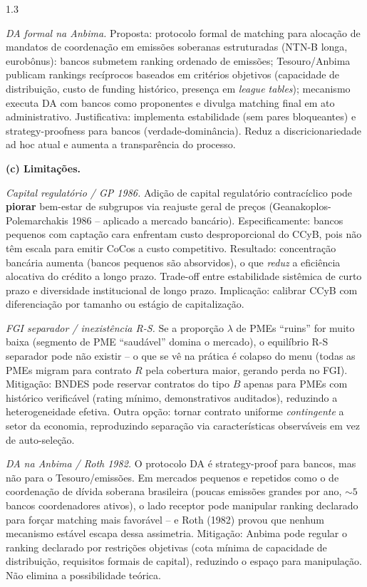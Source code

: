 \documentclass[11pt,addpoints]{exam}
\begin{document}
\begin{spacing}{1.3}
\begin{questions}
\begin{parts}
\begin{solution}
\emph{DA formal na Anbima.} Proposta: protocolo formal de matching para alocação de mandatos de coordenação em emissões soberanas estruturadas (NTN-B longa, eurobônus): bancos submetem ranking ordenado de emissões; Tesouro/Anbima publicam rankings recíprocos baseados em critérios objetivos (capacidade de distribuição, custo de funding histórico, presença em \textit{league tables}); mecanismo executa DA com bancos como proponentes e divulga matching final em ato administrativo. Justificativa: implementa estabilidade (sem pares bloqueantes) e strategy-proofness para bancos (verdade-dominância). Reduz a discricionariedade ad hoc atual e aumenta a transparência do processo.

\textbf{(c) Limitações.}

\emph{Capital regulatório / GP 1986.} Adição de capital regulatório contracíclico pode \textbf{piorar} bem-estar de subgrupos via reajuste geral de preços (Geanakoplos-Polemarchakis 1986 -- aplicado a mercado bancário). Especificamente: bancos pequenos com captação cara enfrentam custo desproporcional do CCyB, pois não têm escala para emitir CoCos a custo competitivo. Resultado: concentração bancária aumenta (bancos pequenos são absorvidos), o que \emph{reduz} a eficiência alocativa do crédito a longo prazo. Trade-off entre estabilidade sistêmica de curto prazo e diversidade institucional de longo prazo. Implicação: calibrar CCyB com diferenciação por tamanho ou estágio de capitalização.

\emph{FGI separador / inexistência R-S.} Se a proporção $\lambda$ de PMEs ``ruins'' for muito baixa (segmento de PME ``saudável'' domina o mercado), o equilíbrio R-S separador pode não existir -- o que se vê na prática é colapso do menu (todas as PMEs migram para contrato $R$ pela cobertura maior, gerando perda no FGI). Mitigação: BNDES pode reservar contratos do tipo $B$ apenas para PMEs com histórico verificável (rating mínimo, demonstrativos auditados), reduzindo a heterogeneidade efetiva. Outra opção: tornar contrato uniforme \emph{contingente} a setor da economia, reproduzindo separação via características observáveis em vez de auto-seleção.

\emph{DA na Anbima / Roth 1982.} O protocolo DA é strategy-proof para bancos, mas não para o Tesouro/emissões. Em mercados pequenos e repetidos como o de coordenação de dívida soberana brasileira (poucas emissões grandes por ano, $\sim 5$ bancos coordenadores ativos), o lado receptor pode manipular ranking declarado para forçar matching mais favorável -- e Roth (1982) provou que nenhum mecanismo estável escapa dessa assimetria. Mitigação: Anbima pode regular o ranking declarado por restrições objetivas (cota mínima de capacidade de distribuição, requisitos formais de capital), reduzindo o espaço para manipulação. Não elimina a possibilidade teórica.


\end{solution}
\end{parts}
\end{questions}
\end{spacing}
\end{document}
